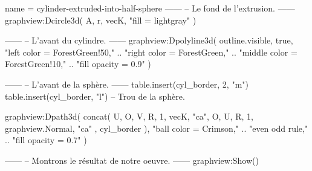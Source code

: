 \documentclass{standalone}
\begin{document}
\begin{luadraw}{name = cylinder-extruded-into-half-sphere}
------
-- Le fond de l'extrusion.
------
graphview:Dcircle3d(
  A, r, vecK,
  "fill = lightgray"
)

------
-- L'avant du cylindre.
------
graphview:Dpolyline3d(
  outline.visible,
  true,
     "left color = ForestGreen!50,"
  .. "right color = ForestGreen,"
  .. "middle color = ForestGreen!10,"
  .. "fill opacity = 0.9"
)

------
-- L'avant de la sphère.
------
table.insert(cyl_border, 2, "m")
table.insert(cyl_border, "l") -- Trou de la sphère.

graphview:Dpath3d(
  concat(
    {
      U, O, V, R, 1, vecK, "ca",
      O, U, R, 1, graphview.Normal, "ca"
    },
    cyl_border
  ),
     "ball color = Crimson,"
  .. "even odd rule,"
  .. "fill opacity = 0.7"
)

------
-- Montrons le résultat de notre oeuvre.
------
graphview:Show()
\end{luadraw}
\end{document}
